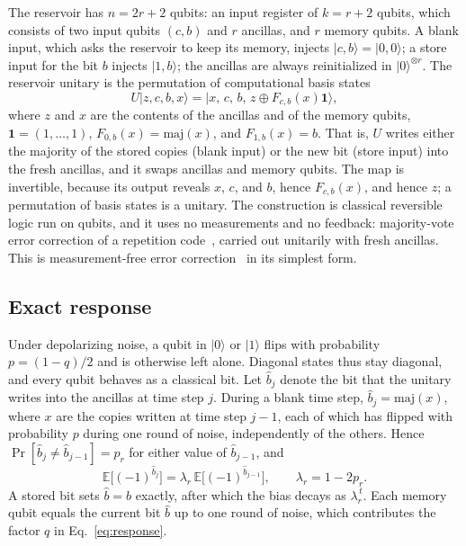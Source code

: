 \documentclass[aps,prl,twocolumn,superscriptaddress,floatfix]{revtex4-2}
\theoremstyle{plain}
\newcommand{\ket}[1]{|#1\rangle}
\begin{document}
The reservoir has $n=2r+2$ qubits: an input register of $k=r+2$ qubits, which consists of two input qubits $(c,b)$ and $r$ ancillas, and $r$ memory qubits. A blank input, which asks the reservoir to keep its memory, injects $\ket{c,b}=\ket{0,0}$; a store input for the bit $b$ injects $\ket{1,b}$; the ancillas are always reinitialized in $\ket0^{\otimes r}$. The reservoir unitary is the permutation of computational basis states
\begin{equation}
U\ket{z,c,b,x}=\ket{x,\,c,\,b,\,z\oplus F_{c,b}(x)\bm1},
\label{eq:S-repU}
\end{equation}
where $z$ and $x$ are the contents of the ancillas and of the memory qubits, $\bm1=(1,\dots,1)$, $F_{0,b}(x)=\mathrm{maj}(x)$, and $F_{1,b}(x)=b$. That is, $U$ writes either the majority of the stored copies (blank input) or the new bit (store input) into the fresh ancillas, and it swaps ancillas and memory qubits. The map is invertible, because its output reveals $x$, $c$, and $b$, hence $F_{c,b}(x)$, and hence $z$; a permutation of basis states is a unitary. The construction is classical reversible logic run on qubits, and it uses no measurements and no feedback: majority-vote error correction of a repetition code~\cite{vonNeumann1956}, carried out unitarily with fresh ancillas. This is measurement-free error correction~\cite{Heussen2024} in its simplest form.

\subsection{Exact response}

Under depolarizing noise, a qubit in $\ket0$ or $\ket1$ flips with probability $p=(1-q)/2$ and is otherwise left alone. Diagonal states thus stay diagonal, and every qubit behaves as a classical bit. Let $\hat b_j$ denote the bit that the unitary writes into the ancillas at time step $j$. During a blank time step, $\hat b_j=\mathrm{maj}(x)$, where $x$ are the copies written at time step $j-1$, each of which has flipped with probability $p$ during one round of noise, independently of the others. Hence $\Pr[\hat b_j\ne\hat b_{j-1}]=p_r$ for either value of $\hat b_{j-1}$, and
\begin{equation}
\mathbb E\bigl[(-1)^{\hat b_j}\bigr]=\lambda_r\,\mathbb E\bigl[(-1)^{\hat b_{j-1}}\bigr],\qquad\lambda_r=1-2p_r .
\end{equation}
A stored bit sets $\hat b=b$ exactly, after which the bias decays as $\lambda_r^{\,t}$. Each memory qubit equals the current bit $\hat b$ up to one round of noise, which contributes the factor $q$ in Eq.~\eqref{eq:response}.
\end{document}
